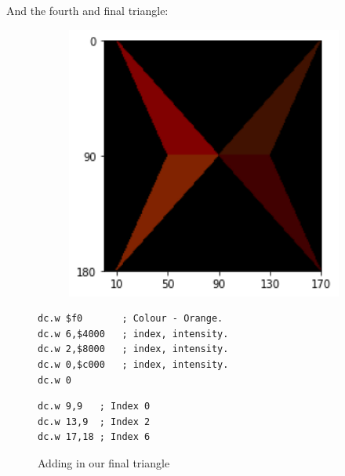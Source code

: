 And the fourth and final triangle:

\begin{figure}[H]
  \centering
  \begin{adjustbox}{width=13cm,center}
    \begin{minipage}[c]{0.48\linewidth}
      \begin{figure}[H]
        \centering
        \begin{adjustbox}{width=5.5cm,center}
          \includegraphics[width=12cm]{src/flipper/flipper_face_4.png}%
        \end{adjustbox}
      \end{figure}
    \end{minipage}
    \begin{minipage}[c]{0.48\linewidth}
      \begin{lstlisting}[basicstyle=\scriptsize\ttfamily]
dc.w $f0       ; Colour - Orange.
dc.w 6,$4000   ; index, intensity.
dc.w 2,$8000   ; index, intensity.
dc.w 0,$c000   ; index, intensity.
dc.w 0
      \end{lstlisting}
      \begin{lstlisting}[basicstyle=\scriptsize\ttfamily]
dc.w 9,9   ; Index 0
dc.w 13,9  ; Index 2
dc.w 17,18 ; Index 6
      \end{lstlisting}
      \vspace*{\fill}
    \end{minipage}
  \end{adjustbox}
  \caption{Adding in our final triangle}
\end{figure}

